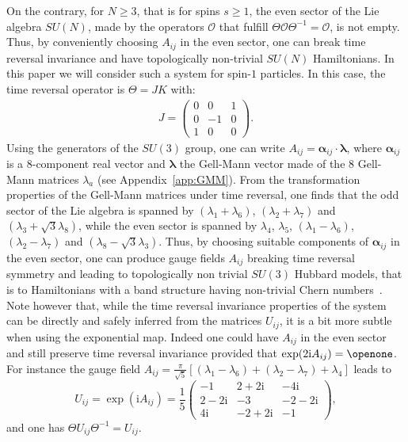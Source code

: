 \documentclass[aps,pra,showpacs,twocolumn,superscriptaddress]{revtex4-1}
\newcommand{\imag}{\mathrm{i}}
\begin{document}
On the contrary, for $N\geq 3$, that is for spins $s \geq 1$, the even sector of the Lie algebra $SU(N)$, 
made by the operators $\mathcal{O}$ that fulfill $\Theta \mathcal{O} \Theta^{-1}= \mathcal{O}$,
is not empty. Thus, by conveniently choosing $A_{ij}$ in the even sector, 
one can break time reversal invariance and have topologically non-trivial $SU(N)$ Hamiltonians. 
In this paper we will consider such a system for spin-$1$ particles. 
In this case, the time reversal operator is $\Theta = J K$ with: 
\begin{align}
	J = \left(\begin{matrix}
		0&0&1\\
		0&-1&0\\
		1&0&0
	\end{matrix}\right).
\end{align}
Using the generators of the $SU(3)$ group, one can write 
$A_{ij} = \bm{\alpha}_{ij} \cdot \boldsymbol{\lambda}$, 
where $\bm{\alpha}_{ij}$ is a $8$-component real vector and 
$\boldsymbol{\lambda}$ the Gell-Mann vector made of the $8$ Gell-Mann matrices $\lambda_a$ 
(see Appendix~\ref{app:GMM}). 
From the transformation properties of the Gell-Mann matrices under time reversal, 
one finds that the odd sector of the Lie algebra is spanned by 
$(\lambda_1+\lambda_6)$, $(\lambda_2+\lambda_7)$ and $(\lambda_3+\sqrt{3} \lambda_8)$, 
while the even sector is spanned  by $\lambda_4$, $\lambda_5$, $(\lambda_1-\lambda_6)$, 
$(\lambda_2-\lambda_7)$ and $(\lambda_8-\sqrt{3} \lambda_3)$. 
Thus, by choosing suitable components of $\bm{\alpha}_{ij}$ in the even sector, 
one can produce gauge fields $A_{ij}$ breaking time reversal symmetry and leading to 
topologically non trivial $SU(3)$ Hubbard models, that is to Hamiltonians with a band structure 
having non-trivial Chern numbers~\cite{Barnett2012}. 
Note however that, while the time reversal invariance properties of the system can be directly and 
safely inferred from the matrices $U_{ij}$, it is a bit more subtle when using the exponential map. 
Indeed one could have $A_{ij}$ in the even sector and 
still preserve time reversal invariance provided that $\exp(2\imag A_{ij}) = \openone$. 
For instance  the gauge field 
$A_{ij} = \frac{\pi}{\sqrt{5}} \left[(\lambda_1-\lambda_6)+(\lambda_2-\lambda_7)+\lambda_4\right]$ leads to 
\begin{equation}
 U_{ij} = \exp(\imag A_{ij})=\frac{1}{5}\left(
 \begin{array}{ccc}
  -1 & 2+2\imag & -4\imag\\
  2-2\imag & -3 & -2-2\imag \\
  4\imag & -2+2\imag & -1 
 \end{array}\right),
\end{equation}
and one has $\Theta U_{ij}\Theta^{-1} = U_{ij}$.
\end{document}

